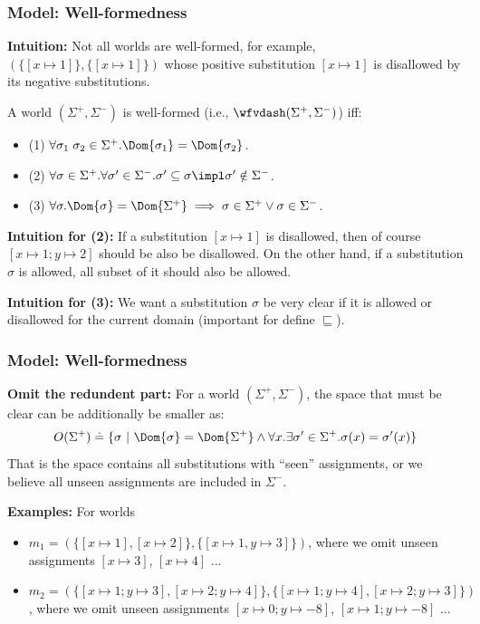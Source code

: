 \begin{frame}[fragile]
    \frametitle{Model: Well-formedness}

\textbf{Intuition:} Not all worlds are well-formed, for example, $(\{[x\mapsto 1]\}, \{[x\mapsto 1]\})$ whose positive substitution $[x\mapsto 1]$ is disallowed by its negative substitutions.

\begin{definition}
    A world $(\Sigma^+, \Sigma^-)$ is well-formed (i.e., $\wfvdash (\Sigma^+, \Sigma^-)$) iff:
    \begin{itemize}
        \item (1) $\forall \sigma_1\;\sigma_2 \in \Sigma^+.\Dom{\sigma_1} = \Dom{\sigma_2}$.
        \item (2) $\forall \sigma\in \Sigma^+.\forall \sigma'\in \Sigma^-. \sigma' \subseteq \sigma \impl \sigma' \notin \Sigma^-$.
        \item (3) $\forall \sigma. \Dom{\sigma} = \Dom{\Sigma^+} \implies \sigma \in \Sigma^+ \lor \sigma \in \Sigma^-$.
    \end{itemize}
\end{definition}

\textbf{Intuition for (2):} If a substitution $[x\mapsto 1]$ is disallowed, then of course $[x\mapsto 1;y\mapsto 2]$ should be also be disallowed. On the other hand, if a substitution $\sigma$ is allowed, all subset of it should also be allowed.

\textbf{Intuition for (3):} We want a substitution $\sigma$ be very clear if it is allowed or disallowed for the current domain (important for define $\sqsubseteq$).
        
\end{frame}

\begin{frame}[fragile]
    \frametitle{Model: Well-formedness}

\textbf{Omit the redundent part: } For a world $(\Sigma^+, \Sigma^-)$, the space that must be clear can be additionally be smaller as:
\begin{align*}
    O(\Sigma^+) \doteq \{ \sigma ~|~ \Dom{\sigma} = \Dom{\Sigma^+} \land \forall x. \exists \sigma' \in \Sigma^+. \sigma(x) = \sigma'(x) \}
\end{align*}\noindent
That is the space contains all substitutions with ``seen'' assignments, or we believe all unseen assignments are included in $\Sigma^-$. 

\textbf{Examples:} For worlds 
\begin{itemize}
    \item $m_1 = (\{[x\mapsto 1], [x\mapsto 2]\}, \{[x\mapsto 1,y\mapsto 3]\})$, where we omit unseen assignments $[x\mapsto 3]$, $[x\mapsto 4]$ ...
    \item $m_2 = (\{[x\mapsto 1;y\mapsto 3], [x\mapsto 2;y\mapsto 4]\}, \{[x\mapsto 1;y\mapsto 4], [x\mapsto 2;y\mapsto 3]\})$, where we omit unseen assignments $[x\mapsto 0;y\mapsto -8]$, $[x\mapsto 1;y\mapsto -8]$ ...
\end{itemize}
        
\end{frame}

